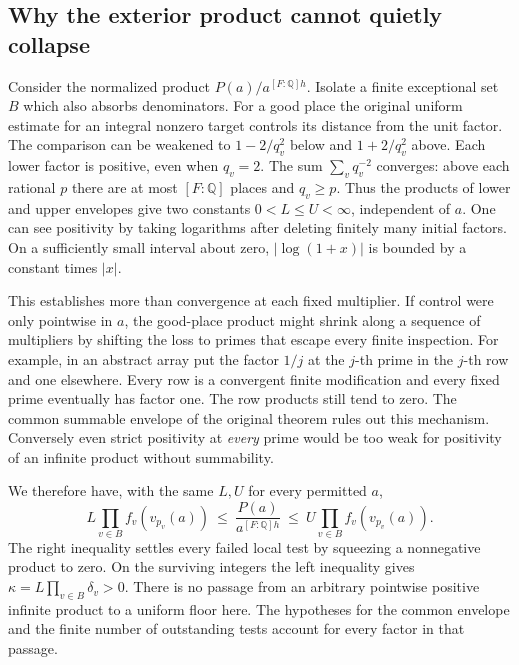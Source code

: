 \documentclass[12pt,letterpaper]{article}
\begin{document}
\subsection{Why the exterior product cannot quietly collapse}
Consider the normalized product $P(a)/a^{[F:\mathbb Q]h}$. Isolate a finite exceptional set $B$ which also absorbs denominators. For a good place the original uniform estimate for an integral nonzero target controls its distance from the unit factor. The comparison can be weakened to $1-2/q_v^2$ below and $1+2/q_v^2$ above. Each lower factor is positive, even when $q_v=2$. The sum $\sum_v q_v^{-2}$ converges: above each rational $p$ there are at most $[F:\mathbb Q]$ places and $q_v\ge p$. Thus the products of lower and upper envelopes give two constants $0<L\le U<\infty$, independent of $a$. One can see positivity by taking logarithms after deleting finitely many initial factors. On a sufficiently small interval about zero, $|\log(1+x)|$ is bounded by a constant times $|x|$.

This establishes more than convergence at each fixed multiplier. If control were only pointwise in $a$, the good-place product might shrink along a sequence of multipliers by shifting the loss to primes that escape every finite inspection. For example, in an abstract array put the factor $1/j$ at the $j$-th prime in the $j$-th row and one elsewhere. Every row is a convergent finite modification and every fixed prime eventually has factor one. The row products still tend to zero. The common summable envelope of the original theorem rules out this mechanism. Conversely even strict positivity at \emph{every} prime would be too weak for positivity of an infinite product without summability.

We therefore have, with the same $L,U$ for every permitted $a$,
\[
 L\prod_{v\in B} f_v(v_{p_v}(a))
  \ \le\ \frac{P(a)}{a^{[F:\mathbb Q]h}}\
  \le\ U\prod_{v\in B} f_v(v_{p_v}(a)).
\]
The right inequality settles every failed local test by squeezing a nonnegative product to zero. On the surviving integers the left inequality gives $\kappa=L\prod_{v\in B}\delta_v>0$. There is no passage from an arbitrary pointwise positive infinite product to a uniform floor here. The hypotheses for the common envelope and the finite number of outstanding tests account for every factor in that passage.
\end{document}
